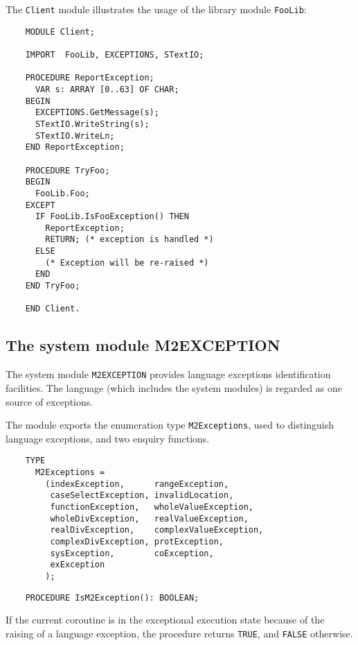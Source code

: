 The {\tt Client} module illustrates the usage of the library module
\verb'FooLib':

\begin{verbatim}
    MODULE Client;

    IMPORT  FooLib, EXCEPTIONS, STextIO;

    PROCEDURE ReportException;
      VAR s: ARRAY [0..63] OF CHAR;
    BEGIN
      EXCEPTIONS.GetMessage(s);
      STextIO.WriteString(s);
      STextIO.WriteLn;
    END ReportException;

    PROCEDURE TryFoo;
    BEGIN
      FooLib.Foo;
    EXCEPT
      IF FooLib.IsFooException() THEN
        ReportException;
        RETURN; (* exception is handled *)
      ELSE
        (* Exception will be re-raised *)
      END
    END TryFoo;

    END Client.
\end{verbatim}

\subsection{The system module M2EXCEPTION}\label{m2:m2exception}

The system module {\tt M2EXCEPTION} provides language exceptions
identification facilities. The language (which includes the
system modules) is regarded as one source of exceptions.

The module exports the enumeration type {\tt M2Exceptions},
used to distinguish language exceptions,
and two enquiry functions.

\begin{verbatim}
    TYPE
      M2Exceptions =
        (indexException,      rangeException,
         caseSelectException, invalidLocation,
         functionException,   wholeValueException,
         wholeDivException,   realValueException,
         realDivException,    complexValueException,
         complexDivException, protException,
         sysException,        coException,
         exException
        );
\end{verbatim}

\verb'    PROCEDURE IsM2Exception(): BOOLEAN;'

If the current coroutine is in the exceptional execution state
because of the raising of a language exception, the procedure returns
\verb'TRUE', and \verb'FALSE' otherwise.

